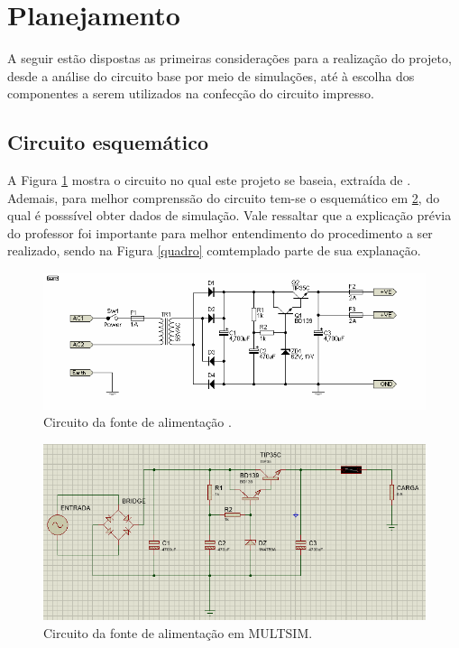 \documentclass[a4paper,12pt,oneside,openany,table,xcdraw]{article}
\begin{document}

\newpage
\section{Planejamento} %
A seguir estão dispostas as primeiras considerações para a realização do projeto, desde a análise do circuito base por meio de simulações, até à escolha dos componentes a serem utilizados na confecção do circuito impresso.

\subsection{Circuito esquemático}
A Figura \ref{circuito} mostra o circuito no qual este projeto se baseia, extraída de \cite{amp}. Ademais, para melhor comprenssão do circuito tem-se o esquemático em \ref{sim1}, do qual é posssível obter dados de simulação. Vale ressaltar que a explicação prévia do professor foi importante para melhor entendimento do procedimento a ser realizado, sendo na Figura \ref{quadro} comtemplado parte de sua explanação.

\begin{figure}[H]
\centering
\captionsetup{font=scriptsize}
\includegraphics[width=15cm]{fonte}
\caption{Circuito da fonte de alimentação \cite{amp}.}
\label{circuito}
\end{figure}

\begin{figure}[H]
\centering
\captionsetup{font=scriptsize}
\includegraphics[width=15cm]{sim1}
\caption{Circuito da fonte de alimentação em MULTSIM.}
\label{sim1}
\end{figure}
\end{document}
